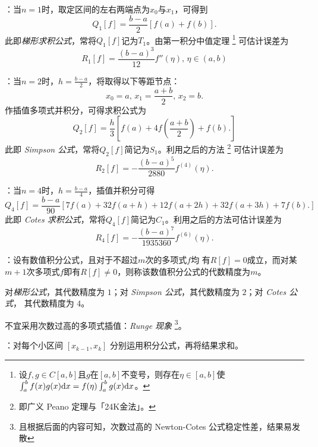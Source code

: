 \entry {}：当$n=1$时，取定区间的左右两端点为$x_0$与$x_1$，可得到
\begin{equation}
Q_1[f]=\frac{b-a}2\left[f(a)+f(b)\right].
\end{equation}
此即\emph{梯形求积公式}，常将$Q_1[f]$记为$T_1$。由第一积分中值定理
\footnote{设$f,g\in C[a,b]$且$g$在$[a,b]$不变号，则存在$\eta\in[a,b]$使
$\int_a^bf(x)g(x)\mathrm{d} x=f(\eta)\int_a^bg(x)\mathrm{d} x$。}
可估计误差为
\begin{equation}
R_1[f]=\frac{(b-a)^3}{12}f''(\eta),\,\eta\in(a,b)
\end{equation}

\entry {}：当$n=2$时，$h=\frac{b-a}2$，将取得以下等距节点：
\[x_0=a,\,x_1=\frac{a+b}2,\,x_2=b.\]
作插值多项式并积分，可得求积公式为
\begin{equation}
Q_2[f]=\frac h3\left[f(a)+4f\left(\frac{a+b}2\right)+f(b).\right]
\end{equation}
此即 \emph{Simpson 公式}，常将$Q_2[f]$简记为$S_1$。利用之后的方法
\footnote{即广义 Peano 定理与「24K金法」。}
可估计误差为
\begin{equation}
R_2[f]=-\frac{(b-a)^5}{2880}f^{(4)}(\eta).
\end{equation}

\entry {}：当$n=4$时，$h=\frac{b-a}4$，插值并积分可得
\begin{equation}
Q_4[f]=\frac{b-a}{90}[7f(a)+32f(a+h)+12f(a+2h)+32f(a+3h)+7f(b).]
\end{equation}
此即 \emph{Cotes 求积公式}，常将$Q_4[f]$简记为$C_1$。利用之后的方法可估计误差为
\begin{equation}
R_4[f]=-\frac{(b-a)^7}{1935360}f^{(6)}(\eta).
\end{equation}

\entry {}：设有数值积分公式，且对于不超过$m$次的多项式$f$均
有$R[f]=0$成立，而对某$m+1$次多项式$f$即有$R[f]\neq0$，则称该数值积分公式的代数精度为$m$。

\entry 对\emph{梯形公式}，其代数精度为 $1$；对 \emph{Simpson 公式}，其代数精度为 $2$；对 \emph{Cotes 公式}，
其代数精度为 $4$。

\entry 不宜采用次数过高的多项式插值：\emph{Runge 现象}
\footnote{且根据后面的内容可知，次数过高的 Newton-Cotes 公式稳定性差，结果易发散}。

\entry {}：对每个小区间 $[x_{k-1},x_k]$ 分别运用积分公式，再将结果求和。


